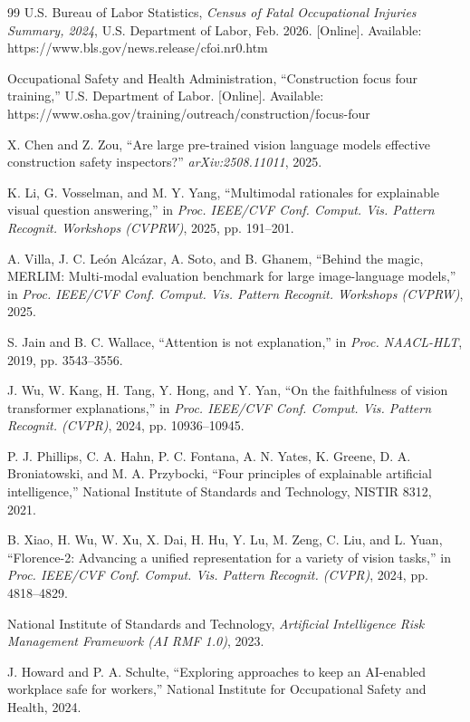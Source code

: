 \documentclass[conference]{IEEEtran}
\begin{document}
\begin{thebibliography}{99}
 U.S. Bureau of Labor Statistics, \emph{Census of Fatal Occupational Injuries Summary, 2024}, U.S. Department of Labor, Feb. 2026. [Online]. Available: https://www.bls.gov/news.release/cfoi.nr0.htm

 Occupational Safety and Health Administration, ``Construction focus four training,'' U.S. Department of Labor. [Online]. Available: https://www.osha.gov/training/outreach/construction/focus-four

 X. Chen and Z. Zou, ``Are large pre-trained vision language models effective construction safety inspectors?'' \emph{arXiv:2508.11011}, 2025.

 K. Li, G. Vosselman, and M. Y. Yang, ``Multimodal rationales for explainable visual question answering,'' in \emph{Proc. IEEE/CVF Conf. Comput. Vis. Pattern Recognit. Workshops (CVPRW)}, 2025, pp. 191--201.

 A. Villa, J. C. Le\'{o}n Alc\'{a}zar, A. Soto, and B. Ghanem, ``Behind the magic, MERLIM: Multi-modal evaluation benchmark for large image-language models,'' in \emph{Proc. IEEE/CVF Conf. Comput. Vis. Pattern Recognit. Workshops (CVPRW)}, 2025.

 S. Jain and B. C. Wallace, ``Attention is not explanation,'' in \emph{Proc. NAACL-HLT}, 2019, pp. 3543--3556.

 J. Wu, W. Kang, H. Tang, Y. Hong, and Y. Yan, ``On the faithfulness of vision transformer explanations,'' in \emph{Proc. IEEE/CVF Conf. Comput. Vis. Pattern Recognit. (CVPR)}, 2024, pp. 10936--10945.

 P. J. Phillips, C. A. Hahn, P. C. Fontana, A. N. Yates, K. Greene, D. A. Broniatowski, and M. A. Przybocki, ``Four principles of explainable artificial intelligence,'' National Institute of Standards and Technology, NISTIR 8312, 2021.

 B. Xiao, H. Wu, W. Xu, X. Dai, H. Hu, Y. Lu, M. Zeng, C. Liu, and L. Yuan, ``Florence-2: Advancing a unified representation for a variety of vision tasks,'' in \emph{Proc. IEEE/CVF Conf. Comput. Vis. Pattern Recognit. (CVPR)}, 2024, pp. 4818--4829.

 National Institute of Standards and Technology, \emph{Artificial Intelligence Risk Management Framework (AI RMF 1.0)}, 2023.

 J. Howard and P. A. Schulte, ``Exploring approaches to keep an AI-enabled workplace safe for workers,'' National Institute for Occupational Safety and Health, 2024.

\end{thebibliography}
\end{document}
